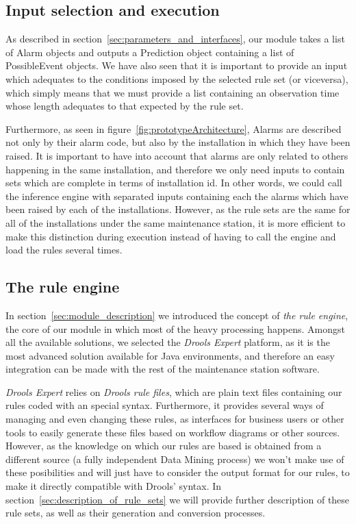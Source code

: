 \subsection{Input selection and execution}
As described in section~\ref{sec:parameters_and_interfaces}, our module takes a list of Alarm objects and outputs a Prediction object containing a list of PossibleEvent objects. We have also seen that it is important to provide an input which adequates to the conditions imposed by the selected rule set (or viceversa), which simply means that we must provide a list containing an observation time whose length adequates to that expected by the rule set.

Furthermore, as seen in figure~\ref{fig:prototypeArchitecture}, Alarms are described not only by their alarm code, but also by the installation in which they have been raised. It is important to have into account that alarms are only related to others happening in the same installation, and therefore we only need inputs to contain sets which are complete in terms of installation id. In other words, we could call the inference engine with separated inputs containing each the alarms which have been raised by each of the installations. However, as the rule sets are the same for all of the installations under the same maintenance station, it is more efficient to make this distinction during execution instead of having to call the engine and load the rules several times.

\subsection{The rule engine}
In section~\ref{sec:module_description} we introduced the concept of \emph{the rule engine}, the core of our module in which most of the heavy processing happens. Amongst all the available solutions, we selected the \emph{Drools Expert}\cite{browne2009jboss} platform, as it is the most advanced solution available for Java environments, and therefore an easy integration can be made with the rest of the maintenance station software.

\emph{Drools Expert} relies on \emph{Drools rule files}, which are plain text files containing our rules coded with an special syntax. Furthermore, it provides several ways of managing and even changing these rules, as interfaces for business users or other tools to easily generate these files based on workflow diagrams or other sources. However, as the knowledge on which our rules are based is obtained from a different source (a fully independent Data Mining process) we won't make use of these posibilities and will just have to consider the output format for our rules, to make it directly compatible with Drools' syntax. In section~\ref{sec:description_of_rule_sets} we will provide further description of these rule sets, as well as their generation and conversion processes.

